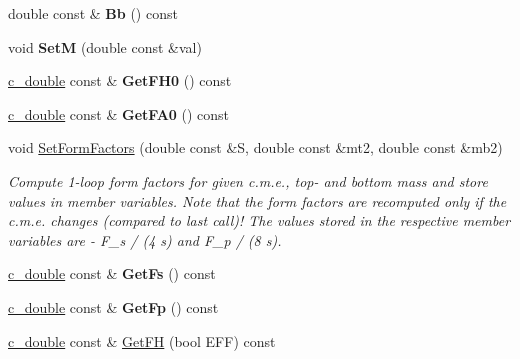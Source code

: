 \begin{DoxyCompactItemize}
\item 
\hypertarget{classHiggsBoson_ad4dc9de0ef7ca8a9c2edb8884e41bd88}{}double const \& {\bfseries Bb} () const \label{classHiggsBoson_ad4dc9de0ef7ca8a9c2edb8884e41bd88}

\item 
\hypertarget{classHiggsBoson_a9b4cda666fb19288713b334bb72e3b40}{}void {\bfseries Set\+M} (double const \&val)\label{classHiggsBoson_a9b4cda666fb19288713b334bb72e3b40}

\item 
\hypertarget{classHiggsBoson_a89f471e351c72fcf5e95846b34727383}{}\hyperlink{Global_8h_af390c6bd8192faf6a1e2d875a1d10ca0}{c\+\_\+double} const \& {\bfseries Get\+F\+H0} () const \label{classHiggsBoson_a89f471e351c72fcf5e95846b34727383}

\item 
\hypertarget{classHiggsBoson_a2be84efb1f350882309f74db3dcc32a5}{}\hyperlink{Global_8h_af390c6bd8192faf6a1e2d875a1d10ca0}{c\+\_\+double} const \& {\bfseries Get\+F\+A0} () const \label{classHiggsBoson_a2be84efb1f350882309f74db3dcc32a5}

\item 
void \hyperlink{classHiggsBoson_a4edd830907f5f06ac24deed99e64da0c}{Set\+Form\+Factors} (double const \&S, double const \&mt2, double const \&mb2)
\begin{DoxyCompactList}\small\item\em Compute 1-\/loop form factors for given c.\+m.\+e., top-\/ and bottom mass and store values in member variables. Note that the form factors are recomputed only if the c.\+m.\+e. changes (compared to last call)! The values stored in the respective member variables are -\/ F\+\_\+s / (4 s) and F\+\_\+p / (8 s). \end{DoxyCompactList}\item 
\hypertarget{classHiggsBoson_a6e3be51e54f71ad1681485d463ba54f9}{}\hyperlink{Global_8h_af390c6bd8192faf6a1e2d875a1d10ca0}{c\+\_\+double} const \& {\bfseries Get\+Fs} () const \label{classHiggsBoson_a6e3be51e54f71ad1681485d463ba54f9}

\item 
\hypertarget{classHiggsBoson_a404990102de3ee3cd1f65a53f0759d76}{}\hyperlink{Global_8h_af390c6bd8192faf6a1e2d875a1d10ca0}{c\+\_\+double} const \& {\bfseries Get\+Fp} () const \label{classHiggsBoson_a404990102de3ee3cd1f65a53f0759d76}

\item 
\hypertarget{classHiggsBoson_af9055e140206943efe94b55ea76c1632}{}\hyperlink{Global_8h_af390c6bd8192faf6a1e2d875a1d10ca0}{c\+\_\+double} const \& \hyperlink{classHiggsBoson_af9055e140206943efe94b55ea76c1632}{Get\+F\+H} (bool E\+F\+F) const \label{classHiggsBoson_af9055e140206943efe94b55ea76c1632}


\end{DoxyCompactItemize}
